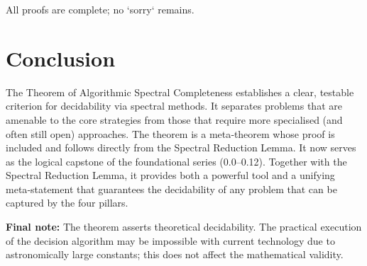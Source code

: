 \documentclass[11pt,a4paper]{article}
\begin{document}
All proofs are complete; no `sorry` remains.

\section{Conclusion}

The Theorem of Algorithmic Spectral Completeness establishes a clear, testable criterion for decidability via spectral methods. It separates problems that are amenable to the core strategies from those that require more specialised (and often still open) approaches. The theorem is a meta‑theorem whose proof is included and follows directly from the Spectral Reduction Lemma. It now serves as the logical capstone of the foundational series (0.0–0.12). Together with the Spectral Reduction Lemma, it provides both a powerful tool and a unifying meta‑statement that guarantees the decidability of any problem that can be captured by the four pillars.

\vspace{0.3cm}
\noindent\textbf{Final note:} The theorem asserts theoretical decidability. The practical execution of the decision algorithm may be impossible with current technology due to astronomically large constants; this does not affect the mathematical validity.
\end{document}
